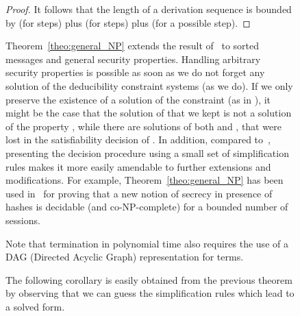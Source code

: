 \documentclass[acmtocl,acmnow]{acmtrans2m}
\newcommand{\dedsyss}[1]{deducibility constraint systems}
\begin{document}
\begin{figure}[t]
{{\begin{proof}
It follows that the length of a derivation sequence is bounded
by   (for  steps)
plus  (for  steps) plus  (for a possible
 step).
\end{proof}

Theorem~\ref{theo:general_NP} extends the result of~\cite{RT01} to
sorted messages and general security properties.
Handling arbitrary security properties is possible as soon as we
do not forget any solution of the \dedsyss{} (as we do). If we only
preserve the existence of a solution of the constraint (as in \cite{RT01}),
it might be the case that the solution of  that we kept is not a solution
of the property , while there are solutions of both  and ,
that were lost in the satisfiability decision of . 
In addition, compared to~\cite{RT01}, presenting the decision
procedure using a small set of simplification rules makes it more
easily amendable to further extensions and modifications.
For example, Theorem~\ref{theo:general_NP} has been used in~\cite{CKKW-fsttcs2006} for
proving that a new notion of secrecy in presence of hashes is
decidable (and co-NP-complete) for a bounded number of sessions.

Note that termination in polynomial time also requires the use of a
DAG (Directed Acyclic Graph) representation for terms.















The following corollary
is easily obtained from the previous theorem by observing that we
can guess the simplification rules which lead to a solved form.

}}
\end{figure}
\end{document}
